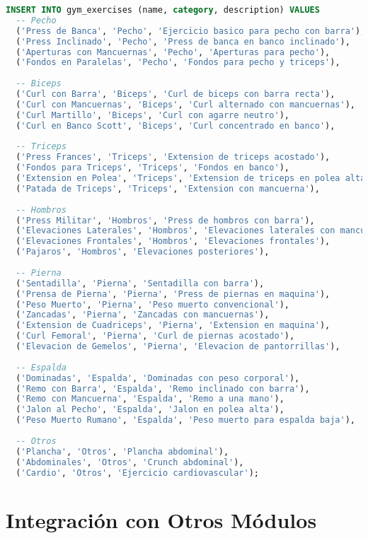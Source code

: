 \documentclass[12pt,a4paper]{article}
\begin{document}
\begin{lstlisting}[language=SQL, caption=Ejercicios por defecto]
  INSERT INTO gym_exercises (name, category, description) VALUES
  -- Pecho
  ('Press de Banca', 'Pecho', 'Ejercicio basico para pecho con barra'),
  ('Press Inclinado', 'Pecho', 'Press de banca en banco inclinado'),
  ('Aperturas con Mancuernas', 'Pecho', 'Aperturas para pecho'),
  ('Fondos en Paralelas', 'Pecho', 'Fondos para pecho y triceps'),
  
  -- Biceps
  ('Curl con Barra', 'Biceps', 'Curl de biceps con barra recta'),
  ('Curl con Mancuernas', 'Biceps', 'Curl alternado con mancuernas'),
  ('Curl Martillo', 'Biceps', 'Curl con agarre neutro'),
  ('Curl en Banco Scott', 'Biceps', 'Curl concentrado en banco'),
  
  -- Triceps
  ('Press Frances', 'Triceps', 'Extension de triceps acostado'),
  ('Fondos para Triceps', 'Triceps', 'Fondos en banco'),
  ('Extension en Polea', 'Triceps', 'Extension de triceps en polea alta'),
  ('Patada de Triceps', 'Triceps', 'Extension con mancuerna'),
  
  -- Hombros
  ('Press Militar', 'Hombros', 'Press de hombros con barra'),
  ('Elevaciones Laterales', 'Hombros', 'Elevaciones laterales con mancuernas'),
  ('Elevaciones Frontales', 'Hombros', 'Elevaciones frontales'),
  ('Pajaros', 'Hombros', 'Elevaciones posteriores'),
  
  -- Pierna
  ('Sentadilla', 'Pierna', 'Sentadilla con barra'),
  ('Prensa de Pierna', 'Pierna', 'Press de piernas en maquina'),
  ('Peso Muerto', 'Pierna', 'Peso muerto convencional'),
  ('Zancadas', 'Pierna', 'Zancadas con mancuernas'),
  ('Extension de Cuadriceps', 'Pierna', 'Extension en maquina'),
  ('Curl Femoral', 'Pierna', 'Curl de piernas acostado'),
  ('Elevacion de Gemelos', 'Pierna', 'Elevacion de pantorrillas'),
  
  -- Espalda
  ('Dominadas', 'Espalda', 'Dominadas con peso corporal'),
  ('Remo con Barra', 'Espalda', 'Remo inclinado con barra'),
  ('Remo con Mancuerna', 'Espalda', 'Remo a una mano'),
  ('Jalon al Pecho', 'Espalda', 'Jalon en polea alta'),
  ('Peso Muerto Rumano', 'Espalda', 'Peso muerto para espalda baja'),
  
  -- Otros
  ('Plancha', 'Otros', 'Plancha abdominal'),
  ('Abdominales', 'Otros', 'Crunch abdominal'),
  ('Cardio', 'Otros', 'Ejercicio cardiovascular');
\end{lstlisting}

\section{Integración con Otros Módulos}
\end{document}
